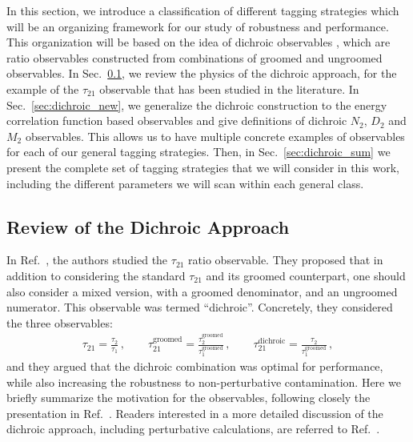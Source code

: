 \documentclass[11pt,letterpaper]{article}
\newcommand{\groomed}{\text{groomed}}
\DeclareRobustCommand{\Sec}[1]{Sec.~\ref{#1}}
\DeclareRobustCommand{\Ref}[1]{Ref.~\cite{#1}}
\begin{document}
In this section, we introduce a classification of different tagging strategies which will be an organizing framework for our study of robustness and performance.
%
This organization will be based on the idea of dichroic observables \cite{Salam:2016yht}, which are ratio observables constructed from combinations of groomed and ungroomed observables.
%
In \Sec{sec:dichroic}, we review the physics of the dichroic approach, for the example of the $\tau_{21}$ observable that has been studied in the literature.
%
In \Sec{sec:dichroic_new}, we generalize the dichroic construction to the energy correlation function based observables and give definitions of dichroic $N_2$, $D_2$ and $M_2$ observables.
%
This allows us to have multiple concrete examples of observables for each of our general tagging strategies.
%
Then, in \Sec{sec:dichroic_sum} we present the complete set of tagging strategies that we will consider in this work, including the different parameters we will scan within each general class.



\subsection{Review of the Dichroic Approach}\label{sec:dichroic}


In \Ref{Salam:2016yht}, the authors studied the $\tau_{21}$ ratio observable.
%
They proposed that in addition to considering the standard $\tau_{21}$ and its groomed counterpart, one should also consider a mixed version, with a groomed denominator, and an ungroomed numerator.
%
This observable was termed ``dichroic''.
%
Concretely, they considered the three observables:
%
\begin{align}
 \tau_{21} =\frac{\tau_2}{\tau_1}  \,, \qquad \tau_{21}^{\text{groomed}} =\frac{\tau_2^\groomed}{\tau_1^\groomed}\,, \qquad \tau_{21}^{\text{dichroic}} =\frac{\tau_2}{\tau_1^\groomed}\,,
\end{align}
%
and they argued that the dichroic combination was optimal for performance, while also increasing the robustness to non-perturbative contamination.
%
Here we briefly summarize the motivation for the observables, following closely the presentation in \Ref{Salam:2016yht}. 
%
Readers interested in a more detailed discussion of the dichroic approach, including perturbative calculations, are referred to \Ref{Salam:2016yht}.
\end{document}
